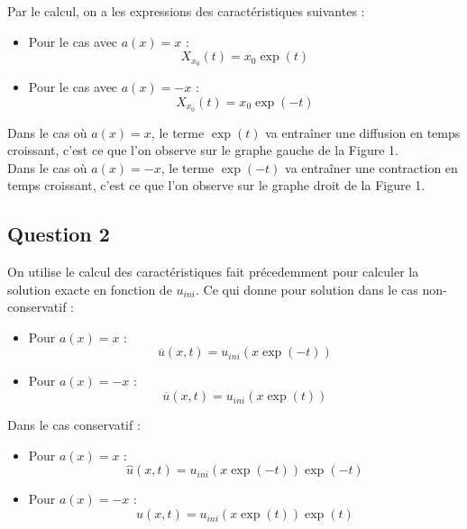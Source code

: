 \documentclass[a4paper,12pt]{article}
\begin{document}
Par le calcul, on a les expressions des caract\'eristiques suivantes :\\
	\begin{itemize}
		\item Pour le cas avec $a(x)=x$ :\\
	    \begin{equation}
			  X_{x_0}(t)=x_0\exp(t)
			  \label{eq_1}
			\end{equation}
	  \item Pour le cas avec $a(x)=-x$ :\\
		  \begin{equation}
	      X_{x_0}(t)=x_0\exp(-t)
				\label{eq_2}
			\end{equation}
	\end{itemize}

Dans le cas o\`u $a(x)=x$, le terme $\exp(t)$ va entra\^iner une diffusion en temps croissant, c'est ce que l'on observe sur le graphe gauche de la Figure 1.\\
\tab \tab Dans le cas o\`u $a(x)=-x$, le terme $\exp(-t)$ va entra\^iner une contraction en temps croissant, c'est ce que l'on observe sur le graphe droit de la Figure 1.

\subsection{Question 2}

On utilise le calcul des caract\'eristiques fait pr\'ecedemment pour calculer la solution exacte en fonction de $u_{ini}$.
Ce qui donne pour solution dans le cas non-conservatif :
\begin{itemize}
  \item Pour $a(x)=x$ :\\
    \begin{equation}
		  \overline{u}(x,t)=u_{ini}(x\exp(-t))
			\label{eq_3}
		\end{equation}
	\item Pour $a(x)=-x$ :\\
	  \begin{equation}
		  \overline{u}(x,t)=u_{ini}(x\exp(t))
			\label{eq_4}
		\end{equation}
\end{itemize}
Dans le cas conservatif :\\
\begin{itemize}
  \item Pour $a(x)=x$ :\\
	  \begin{equation}
		  \hat{u}(x,t)=u_{ini}(x\exp(-t))\exp(-t)
			\label{eq_5}
		\end{equation}
	\item Pour $a(x)=-x$ :\\
	  \begin{equation}
		  \hat{u}(x,t)=u_{ini}(x\exp(t))\exp(t)
			\label{eq_6}
		\end{equation}
\end{itemize}
	
\end{document}
